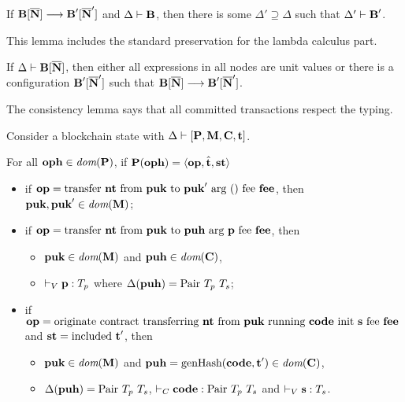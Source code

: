 \documentclass[runningheads]{llncs}
\begin{document}
\begin{lemma}[Preservation]
  If $\BLOCKCHAIN[\overline\NODE] \SystemTrans{} \BLOCKCHAIN'[\overline\NODE']$ and
  $\JTypeBlockchain\Delta \BLOCKCHAIN$, then there is some
  $\Delta' \supseteq \Delta$ such that
  $\JTypeBlockchain{\Delta'}{ \BLOCKCHAIN'}$.
\end{lemma}
This lemma includes the standard preservation for the lambda calculus part.
\begin{lemma}[Progress]
  If $\JTypeConfig\Delta{\BLOCKCHAIN[\overline\NODE]}$, then either
  all expressions in all nodes are unit values or there is a
  configuration $\BLOCKCHAIN'[\overline\NODE']$ such that
  $\BLOCKCHAIN[\overline\NODE] \SystemTrans \BLOCKCHAIN'[\overline\NODE']$.
\end{lemma}
The consistency lemma says that all committed transactions respect the
typing.
\begin{lemma}[Consistency]
Consider a blockchain state with $\JTypeBlockchain\Delta {[\PENDING, \MANAGERS, \CONTRACTORS,
\TIME]}$.

For all $\OPH\in\DOM (\PENDING)$,
if  $\PENDING (\OPH) =  \Angle{\OP, \hat\TIME, \STATUS}$
\begin{itemize}
\item if $\OP = \TRANSFER\NTEZ\PUK{\PUK'}\MTEZ$, then
  $\PUK, \PUK' \in \DOM (\MANAGERS)$;
\item if $\OP = \TRANSFER[\PARAMETER]\NTEZ\PUK\PUH\MTEZ$, then
  \begin{itemize}
  \item $\PUK \in \DOM (\MANAGERS)$ and $\PUH\in\DOM (\CONTRACTORS)$,
  \item $\JTypeValue\PARAMETER{ \TYPE_p}$ where $\Delta (\PUH)  =\TPAIR\ \TYPE_p\ \TYPE_s$;
  \end{itemize}
\item if $\OP = \ORIGINATE\NTEZ\PUK\CODE\STRING\MTEZ$ and $\STATUS =
  \STATUSINCLUDED\ \TIME'$, then
  \begin{itemize}
  \item $\PUK \in \DOM (\MANAGERS)$ and  $\PUH =\GENERATEHASH (\CODE, \TIME') \in \DOM (\CONTRACTORS)$,
  \item $\Delta (\PUH)  =\TPAIR\ \TYPE_p\ \TYPE_s$,  $\JTypeCode\CODE{
      \TPAIR\ \TYPE_p\ \TYPE_s}$ and $\JTypeValue\STRING{ \TYPE_s}$.
  \end{itemize}
\end{itemize}
\end{lemma}
\end{document}
